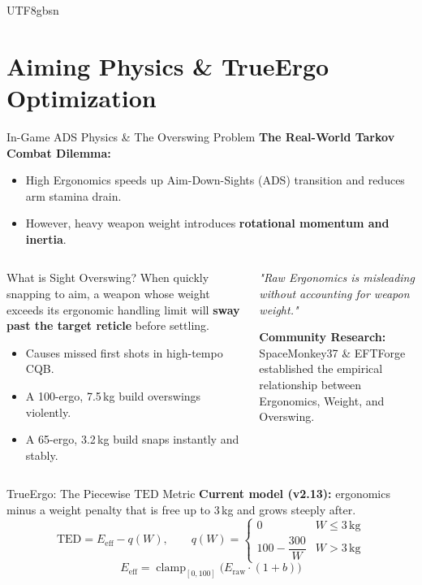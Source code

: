 \documentclass[aspectratio=169]{beamer}
\begin{document}
\begin{CJK*}{UTF8}{gbsn}
\section{Aiming Physics \& TrueErgo Optimization}

\begin{frame}{In-Game ADS Physics \& The Overswing Problem}
    \textbf{The Real-World Tarkov Combat Dilemma:}
    \begin{itemize}
        \item High Ergonomics speeds up Aim-Down-Sights (ADS) transition and reduces arm stamina drain.
        \item However, heavy weapon weight introduces \textbf{rotational momentum and inertia}.
    \end{itemize}

    \vspace{0.3cm}
    \begin{columns}
        \begin{block}{What is Sight Overswing?}
            When quickly snapping to aim, a weapon whose weight exceeds its ergonomic handling limit will \textbf{sway past the target reticle} before settling.
            \begin{itemize}
                \item Causes missed first shots in high-tempo CQB.
                \item A 100-ergo, 7.5\,kg build overswings violently.
                \item A 65-ergo, 3.2\,kg build snaps instantly and stably.
            \end{itemize}
        \end{block}

        \begin{center}
        \textit{"Raw Ergonomics is misleading without accounting for weapon weight."}
        
        \vspace{0.3cm}
        \textbf{Community Research:}\\
        SpaceMonkey37 \& EFTForge established the empirical relationship between Ergonomics, Weight, and Overswing.
        \end{center}
    \end{columns}
\end{frame}

\begin{frame}{TrueErgo: The Piecewise $\text{TED}$ Metric}
    \small\textbf{Current model (v2.13):} ergonomics minus a weight penalty that is free up to 3\,kg and grows steeply after.
    \[
    \text{TED} = E_{\text{eff}} - q(W), \qquad
    q(W) = \begin{cases} 0 & W \le 3\,\text{kg} \\[2pt] 100 - \dfrac{300}{W} & W > 3\,\text{kg} \end{cases}
    \]
    \[
    E_{\text{eff}} = \operatorname{clamp}_{[0,100]}\!\big(E_{\text{raw}} \cdot (1 + b)\big)
    \]


\end{frame}
\end{CJK*}
\end{document}
